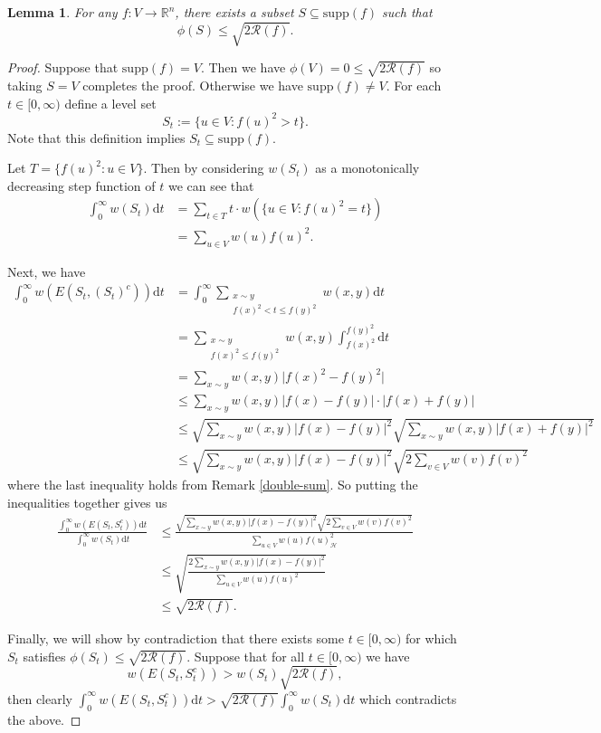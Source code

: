 \documentclass[a4paper,11pt]{article}
\newtheorem{lemma}[theorem]{Lemma}
\theoremstyle{definition}
\newcommand{\R}{\mathbb{R}}
\newcommand{\rayleigh}[1]{\mathcal{R}\left(#1\right)}
\newcommand{\supp}[1]{\mathrm{supp}\left(#1\right)}
\begin{document}
\begin{lemma}\label{cheeger-relax}
For any $f: V \to \R^n$, there exists a subset $S \subseteq \supp{f}$ such that
\[\phi(S) \le \sqrt{2\rayleigh{f}}.\]
\end{lemma}
\begin{proof}
Suppose that $\supp{f} = V$. Then we have $\phi(V) = 0 \le \sqrt{2 \rayleigh{f}}$ so taking $S = V$ completes the proof. Otherwise we have $\supp{f} \ne V$. For each $t \in [0, \infty)$ define a level set
\[
S_t := \{ u \in V : f(u)^2 > t \}
.\] Note that this definition implies $S_t \subseteq \supp{f}$.

Let $T = \{ f(u)^2 : u \in V \}$. Then by considering $w(S_t)$ as a monotonically decreasing step function of $t$ we can see that
\begin{align*}
\int_0^\infty w(S_t)\mathrm{d}t &= \sum_{t \in T} t \cdot w(\{ u \in V : f(u)^2 = t\}) \\
&= \sum_{u \in V}w(u)f(u)^2.
\end{align*}

Next, we have
\begin{align*}
\int_0^\infty w(E(S_t, \left(S_t\right)^c))\mathrm{d}t
&= \int_0^\infty \sum_{\substack{x \sim y \\ f(x)^2 < t \le f(y)^2}} w(x, y) \mathrm{d}t \\
&= \sum_{\substack{x \sim y \\ f(x)^2 \le f(y)^2}} w(x, y) \int_{f(x)^2}^{f(y)^2} \mathrm{d}t \\
&= \sum_{x \sim y} w(x, y) \Big|f(x)^2 - f(y)^2\Big| \\
&\le \sum_{x \sim y} w(x, y)|f(x) - f(y)| \cdot |f(x) + f(y)| \\
&\le \sqrt{\sum_{x \sim y} w(x, y)|f(x) - f(y)|^2} \sqrt{\sum_{x \sim y} w(x, y)|f(x) + f(y)|^2} \\
&\le \sqrt{\sum_{x \sim y} w(x, y)|f(x) - f(y)|^2} \sqrt{2\sum_{v \in V} w(v)f(v)^2}
\end{align*}
where the last inequality holds from Remark \ref{double-sum}. So putting the inequalities together gives us
\begin{align*}
\frac{\int_0^\infty w(E(S_t, S_t^c))\mathrm{d}t}{\int_0^\infty w(S_t)\mathrm{d}t}
&\le \frac{\sqrt{\sum_{x \sim y} w(x, y)|f(x) - f(y)|^2} \sqrt{2\sum_{v \in V} w(v)f(v)^2}}{\sum_{u \in V}w(u)f(u)^2_{\mathcal{H}}} \\
&\le \sqrt{\frac{2\sum_{x \sim y} w(x, y)|f(x) - f(y)|^2}{\sum_{u \in V}w(u)f(u)^2}} \\
&\le \sqrt{2\rayleigh{f}}.
\end{align*}

Finally, we will show by contradiction that there exists some $t \in [0, \infty)$ for which $S_t$ satisfies $\phi(S_t) \le \sqrt{2 \rayleigh{f}}$. Suppose that for all $t \in [0, \infty)$ we have
\[
w(E(S_t, S^c_t)) > w(S_t)\sqrt{2\rayleigh{f}},
\] then clearly $\int_0^\infty w(E(S_t, S^c_t))\mathrm{d}t > \sqrt{2\rayleigh{f}} \int_0^\infty w(S_t)\mathrm{d}t$ which contradicts the above.
\end{proof}
\end{document}
